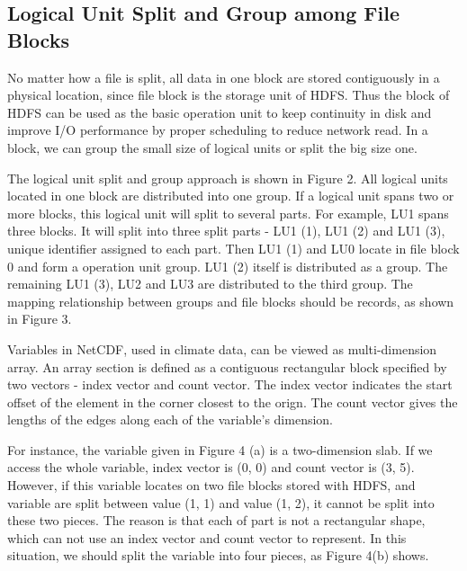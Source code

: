 \documentclass[preprint,12pt]{elsarticle}
\begin{document}
\subsection{Logical Unit Split and Group among File Blocks}
No matter how a file is split, all data in one block are stored contiguously in a physical location, since file block is the storage
unit of HDFS. Thus the block of HDFS can be used as the basic operation unit to keep continuity in disk and improve I/O performance 
by proper scheduling to reduce network read. In a block, we can group the small size of logical units or split the big size one.\par
The logical unit split and group approach is shown in Figure 2. All logical units located in one block are distributed into one group. 
If a logical unit spans two or more blocks, this logical unit will split to several parts. For example, LU1 spans three blocks. It will 
split into three split parts - LU1 (1), LU1 (2) and LU1 (3), unique identifier assigned to each part. Then LU1 (1) and LU0 locate in file
block 0 and form a operation unit group. LU1 (2) itself is distributed as a group. The remaining LU1 (3), LU2 and LU3 are distributed to the 
third group. The mapping relationship between groups and file blocks should be records, as shown in Figure 3. \par
Variables in NetCDF, used in climate data, can be viewed as multi-dimension array. An array section is defined as a contiguous rectangular
block specified by two vectors - index vector and count vector. The index vector indicates the start offset of the element in the corner
closest to the orign. The count vector gives the lengths of the edges along each of the variable's dimension. \par
For instance, the variable given in Figure 4 (a) is a two-dimension slab. If we access the whole variable, index vector is (0, 0) and 
count vector is (3, 5). However, if this variable locates on two file blocks stored with HDFS, and variable are split between value (1, 1) 
and value (1, 2), it cannot be split into these two pieces. The reason is that each of part is not a rectangular shape, which can not use
an index vector and count vector to represent. In this situation, we should split the variable into four pieces, as Figure 4(b) shows.
\end{document}
